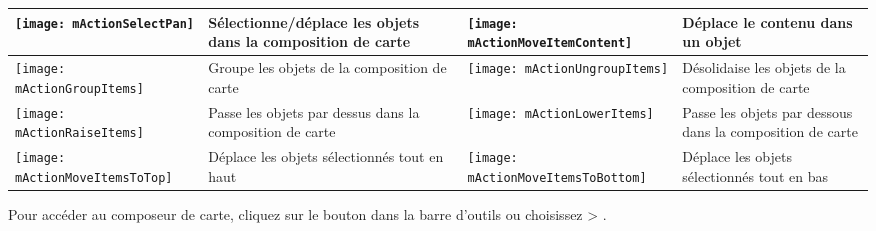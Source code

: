 {\begin{table}[h]
\begin{tabular}{|l|p{6.9cm}|l|p{6.9cm}|}
\hline \texttt{[image: mActionSelectPan]} & S\'electionne/d\'eplace les
objets dans la composition de carte &
\texttt{[image: mActionMoveItemContent]} & D\'eplace le contenu dans
un objet \\
 \hline \texttt{[image: mActionGroupItems]} & Groupe les objets de
la composition de carte & 
 \texttt{[image: mActionUngroupItems]} & D\'esolidaise les objets de
la composition de carte \\
 \hline \texttt{[image: mActionRaiseItems]} & Passe les objets par
dessus dans la composition de carte &
\texttt{[image: mActionLowerItems]} & Passe les objets par dessous
dans la composition de carte \\
 \hline \texttt{[image: mActionMoveItemsToTop]} & D\'eplace les
objets s\'electionn\'es tout en haut & 
 \texttt{[image: mActionMoveItemsToBottom]} & D\'eplace les
objets s\'electionn\'es tout en bas \\
\hline
\end{tabular}
\end{table}

Pour acc\'eder au composeur de carte, cliquez sur le bouton
 dans la barre d'outils ou choisissez
 > .

}
